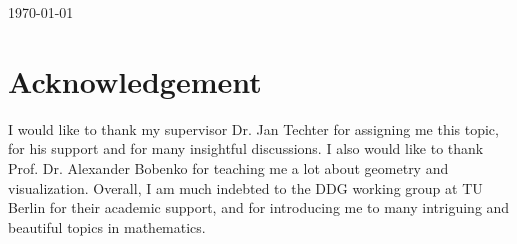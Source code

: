 \documentclass[10pt, a4paper]{article}
\theoremstyle{BoldTopSpacing}
\theoremstyle{BoldTopSpacing}
\theoremstyle{BoldTopSpacing}
\theoremstyle{BoldTopBottomSpacing}
\theoremstyle{BoldTopSpacing}
\theoremstyle{BoldTopBottomSpacing}
\theoremstyle{remark}
\begin{document}
\begin{titlepage}
\begin{center}
\vspace{260 pt}
{\large\today}
\end{center}
\end{titlepage}
\pagestyle{fancy}
\section*{Acknowledgement}
I would like to thank my supervisor Dr. Jan Techter for assigning me this topic, for his support and for many insightful discussions. I also would like to thank Prof. Dr. Alexander Bobenko for teaching me a lot about geometry and visualization. Overall, I am much indebted to the DDG working group at TU Berlin for their academic support, and for introducing me to many intriguing and beautiful topics in mathematics. \par
\vspace{2.2em}
\end{document}
